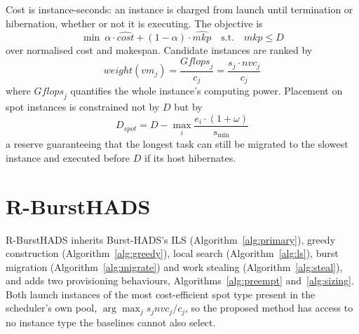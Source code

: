 \documentclass[conference]{IEEEtran}
\begin{document}
Cost is instance-seconds: an instance is charged from launch until termination
or hibernation, whether or not it is executing. The objective is
\begin{equation}
\min\ \alpha \cdot \widehat{\mathit{cost}} + (1-\alpha)\cdot \widehat{\mathit{mkp}}
\quad \text{s.t.}\quad \mathit{mkp} \leq D
\label{eq:fitness}
\end{equation}
over normalised cost and makespan. Candidate instances are ranked by
\begin{equation}
\mathit{weight}(vm_j) = \frac{\mathit{Gflops}_j}{c_j} = \frac{s_j \cdot \mathit{nvc}_j}{c_j}
\label{eq:wrr}
\end{equation}
where $\mathit{Gflops}_j$ quantifies the whole instance's computing power.
Placement on spot instances is constrained not by $D$ but by
\begin{equation}
D_{\mathit{spot}} = D - \max_i \frac{e_i \cdot (1+\omega)}{s_{\min}}
\label{eq:dspot}
\end{equation}
a reserve guaranteeing that the longest task can still be migrated to the
slowest instance and executed before $D$ if its host hibernates.

\section{R-BurstHADS}
\label{sec:design}

R-BurstHADS inherits Burst-HADS's ILS (Algorithm~\ref{alg:primary}), greedy
construction (Algorithm~\ref{alg:greedy}), local search
(Algorithm~\ref{alg:ls}), burst migration (Algorithm~\ref{alg:migrate}) and
work stealing (Algorithm~\ref{alg:steal}), and adds two provisioning
behaviours, Algorithms~\ref{alg:preempt} and~\ref{alg:sizing}. Both launch
instances of the most cost-efficient spot type present in the scheduler's own
pool, $\arg\max_j s_j\mathit{nvc}_j/c_j$, so the proposed method has access to
no instance type the baselines cannot also select.
\end{document}
